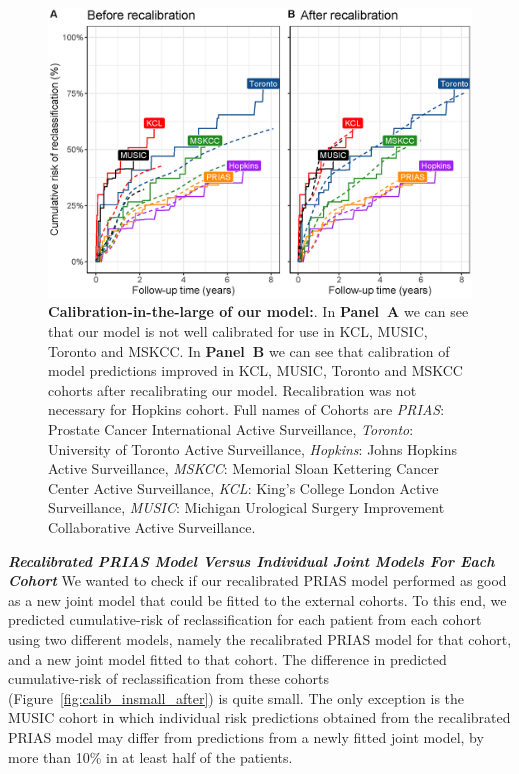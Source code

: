 \begin{figure}[!htb]
\centerline{\includegraphics[width=\columnwidth]{images/calib_before_after.eps}}
\caption{\textbf{Calibration-in-the-large of our model:}. In \textbf{Panel~A} we can see that our model is not well calibrated for use in KCL, MUSIC, Toronto and MSKCC. In \textbf{Panel~B} we can see that calibration of model predictions improved in KCL, MUSIC, Toronto and MSKCC cohorts after recalibrating our model. Recalibration was not necessary for Hopkins cohort. Full names of Cohorts are \textit{PRIAS}: Prostate Cancer International Active Surveillance, \textit{Toronto}: University of Toronto Active Surveillance, \textit{Hopkins}: Johns Hopkins Active Surveillance, \textit{MSKCC}: Memorial Sloan Kettering Cancer Center Active Surveillance, \textit{KCL}: King's College London Active Surveillance, \textit{MUSIC}: Michigan Urological Surgery Improvement Collaborative Active Surveillance.}
\label{fig:calib_before_after}
\end{figure}

\clearpage
\textbf{\textit{Recalibrated PRIAS Model Versus Individual Joint Models For Each Cohort}}
We wanted to check if our recalibrated PRIAS model performed as good as a new joint model that could be fitted to the external cohorts. To this end, we predicted cumulative-risk of reclassification for each patient from each cohort using two different models, namely the recalibrated PRIAS model for that cohort, and a new joint model fitted to that cohort. The difference in predicted cumulative-risk of reclassification from these cohorts (Figure~\ref{fig:calib_insmall_after}) is quite small. The only exception is the MUSIC cohort in which individual risk predictions obtained from the recalibrated PRIAS model may differ from predictions from a newly fitted joint model, by more than 10\% in at least half of the patients.
 
